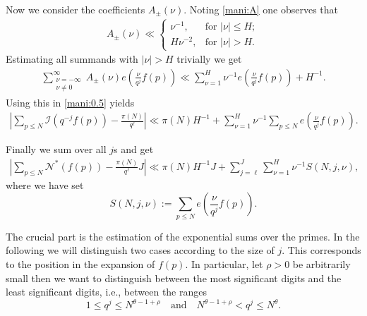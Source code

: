 \documentclass[a4paper,10pt]{amsart}
\numberwithin{equation}{section}
\theoremstyle{definition}
\theoremstyle{remark}
\renewcommand{\lvert}{\left\vert}
\renewcommand{\rvert}{\right\vert}
\begin{document}
Now we consider the coefficients $A_\pm(\nu)$. Noting
\eqref{mani:A} one observes that
\begin{gather*}
A_\pm(\nu)\ll\begin{cases}
  \nu^{-1},       &\text{for }\lvert\nu\rvert\leq H;\\
  H\nu^{-2}, &\text{for }\lvert\nu\rvert>H.
          \end{cases}
\end{gather*}
Estimating all summands with $\lvert\nu\rvert>H$ trivially we get
\begin{gather*}%
\sum_{\substack{\nu=-\infty\\\nu\neq0}}^\infty
  A_\pm(\nu)e\left(\frac{\nu}{q^j}f(p)\right)
\ll\sum_{\nu=1}^{H}\nu^{-1}e\left(\frac{\nu}{q^j}f(p)\right)+H^{-1}.
\end{gather*}
Using this in \eqref{mani:0.5} yields
\begin{gather}\label{mani:1.5}
\lvert\sum_{p\leq N}\mathcal{I}(q^{-j}f(p))-\frac{\pi(N)}{q^{\ell}}\rvert
\ll\pi(N)H^{-1}+\sum_{\nu=1}^{H}
\nu^{-1}\sum_{p\leq N}e\left(\frac{\nu}{q^j}f(p)\right).
\end{gather}

Finally we sum over all $j$s and get
\begin{equation}\label{mani:2}
\begin{split}
\lvert\sum_{p\leq N}\mathcal{N}^*(f(p))-\frac{\pi(N)}{q^{\ell}}J\rvert
\ll\pi(N)H^{-1}J+\sum_{j=\ell}^J\sum_{\nu=1}^{H}
\nu^{-1}S(N,j,\nu),
\end{split}
\end{equation}
where we have set
\[
S(N,j,\nu):=\sum_{p\leq N}e\left(\frac{\nu}{q^j}f(p)\right).
\]

The crucial part is the estimation of the exponential sums over the
primes. In the following we will distinguish two cases according to the size of
$j$. This corresponds to the position in the expansion of $f(p)$. In
particular, let $\rho>0$ be arbitrarily small then we want to distinguish
between the most significant digits and the least significant digits,
i.e., between the ranges
\[
1\leq q^j\leq N^{\theta-1+\rho}
\quad\text{and}\quad
N^{\theta-1+\rho}<q^j\leq N^\theta.
\]
\end{document}
